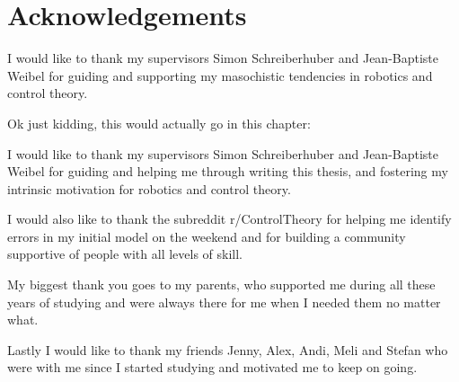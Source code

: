 \documentclass[class=report, crop=false]{standalone}
\begin{document}
\chapter{Acknowledgements}\label{cha:acknowledgements}

I would like to thank my supervisors Simon Schreiberhuber and Jean-Baptiste Weibel for guiding and supporting my masochistic tendencies in robotics and control theory.

Ok just kidding, this would actually go in this chapter: 

I would like to thank my supervisors Simon Schreiberhuber and Jean-Baptiste Weibel for guiding and helping me through writing this thesis, and fostering my intrinsic motivation for robotics and control theory.

I would also like to thank the subreddit r/ControlTheory for helping me identify errors in my initial model on the weekend and for building a community supportive of people with all levels of skill.

My biggest thank you goes to my parents, who supported me during all these years of studying and were always there for me when I needed them no matter what.

Lastly I would like to thank my friends Jenny, Alex, Andi, Meli and Stefan who were with me since I started studying and motivated me to keep on going.
\end{document}
